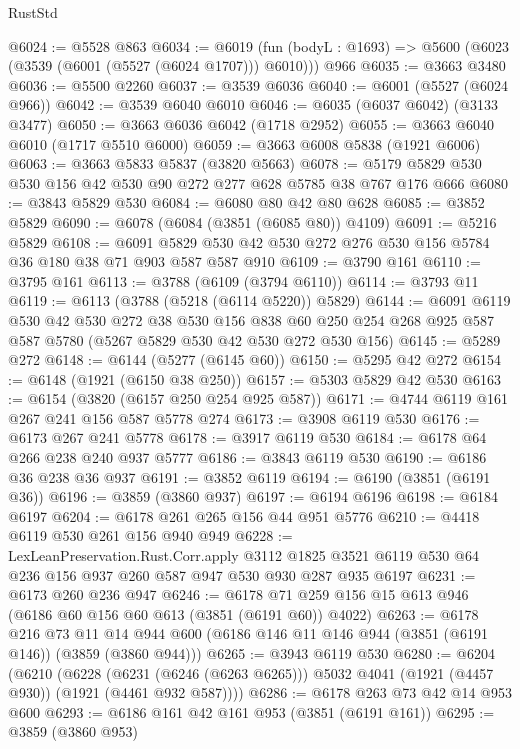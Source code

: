 \begin{lexlean}{RustStd}
\begin{coremodule}
@6024 := @5528 @863
@6034 := @6019
    (fun (bodyL : @1693) => @5600 (@6023 (@3539 (@6001 (@5527 (@6024 @1707))) @6010)))
    @966
@6035 := @3663 @3480
@6036 := @5500 @2260
@6037 := @3539 @6036
@6040 := @6001 (@5527 (@6024 @966))
@6042 := @3539 @6040 @6010
@6046 := @6035 (@6037 @6042) (@3133 @3477)
@6050 := @3663 @6036 @6042 (@1718 @2952)
@6055 := @3663 @6040 @6010 (@1717 @5510 @6000)
@6059 := @3663 @6008 @5838 (@1921 @6006)
@6063 := @3663 @5833 @5837 (@3820 @5663)
@6078 := @5179 @5829 @530 @530 @156 @42 @530 @90 @272 @277 @628 @5785 @38 @767 @176 @666
@6080 := @3843 @5829 @530
@6084 := @6080 @80 @42 @80 @628
@6085 := @3852 @5829
@6090 := @6078 (@6084 (@3851 (@6085 @80)) @4109)
@6091 := @5216 @5829
@6108 := @6091 @5829 @530 @42 @530 @272 @276 @530 @156 @5784 @36 @180 @38 @71 @903 @587 @587 @910
@6109 := @3790 @161
@6110 := @3795 @161
@6113 := @3788 (@6109 (@3794 @6110))
@6114 := @3793 @11
@6119 := @6113 (@3788 (@5218 (@6114 @5220)) @5829)
@6144 := @6091
    @6119
    @530
    @42
    @530
    @272
    @38
    @530
    @156
    @838
    @60
    @250
    @254
    @268
    @925
    @587
    @587
    @5780
    (@5267 @5829 @530 @42 @530 @272 @530 @156)
@6145 := @5289 @272
@6148 := @6144 (@5277 (@6145 @60))
@6150 := @5295 @42 @272
@6154 := @6148 (@1921 (@6150 @38 @250))
@6157 := @5303 @5829 @42 @530
@6163 := @6154 (@3820 (@6157 @250 @254 @925 @587))
@6171 := @4744 @6119 @161 @267 @241 @156 @587 @5778 @274
@6173 := @3908 @6119 @530
@6176 := @6173 @267 @241 @5778
@6178 := @3917 @6119 @530
@6184 := @6178 @64 @266 @238 @240 @937 @5777
@6186 := @3843 @6119 @530
@6190 := @6186 @36 @238 @36 @937
@6191 := @3852 @6119
@6194 := @6190 (@3851 (@6191 @36))
@6196 := @3859 (@3860 @937)
@6197 := @6194 @6196
@6198 := @6184 @6197
@6204 := @6178 @261 @265 @156 @44 @951 @5776
@6210 := @4418 @6119 @530 @261 @156 @940 @949
@6228 := LexLeanPreservation.Rust.Corr.apply
    @3112
    @1825
    @3521
    @6119
    @530
    @64
    @236
    @156
    @937
    @260
    @587
    @947
    @530
    @930
    @287
    @935
    @6197
@6231 := @6173 @260 @236 @947
@6246 := @6178 @71 @259 @156 @15 @613 @946 (@6186 @60 @156 @60 @613 (@3851 (@6191 @60)) @4022)
@6263 := @6178
    @216
    @73
    @11
    @14
    @944
    @600
    (@6186 @146 @11 @146 @944 (@3851 (@6191 @146)) (@3859 (@3860 @944)))
@6265 := @3943 @6119 @530
@6280 := @6204
    (@6210
      (@6228
        (@6231 (@6246 (@6263 @6265)))
        @5032
        @4041
        (@1921 (@4457 @930))
        (@1921 (@4461 @932 @587))))
@6286 := @6178 @263 @73 @42 @14 @953 @600
@6293 := @6186 @161 @42 @161 @953 (@3851 (@6191 @161))
@6295 := @3859 (@3860 @953)

\end{coremodule}
\end{lexlean}
